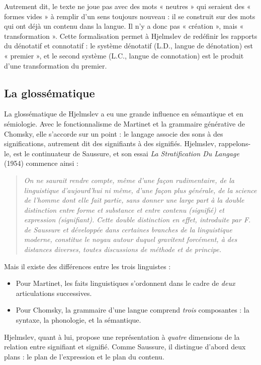Autrement dit, le texte ne joue pas avec des mots « neutres » qui seraient des « formes vides » à remplir d’un sens toujours nouveau : il se construit sur des mots qui ont déjà un contenu dans la langue. Il n’y a donc pas « création », mais « transformation ». Cette formalisation permet à Hjelmslev de redéfinir les rapports du dénotatif et connotatif : le système dénotatif (L.D., langue de dénotation) est « premier », et le second système (L.C., langue de connotation) est le produit d’une transformation du premier.

\subsection{La glossématique}
La glossématique de Hjelmslev a eu une grande influence en sémantique et en sémiologie. Avec le fonctionnalisme de Martinet et la grammaire générative de Chomsky, elle s’accorde sur un point : le langage associe des sons à des significations, autrement dit des signifiants à des signifiés. Hjelmslev, rappelons-le, est le continuateur de Saussure, et son essai \textit{La Stratification Du Langage} (1954) commence ainsi :
\begin{quote}\small\itshape
On ne saurait rendre compte, même d’une façon rudimentaire, de la linguistique d’aujourd’hui ni même, d’une façon plus générale, de la science de l’homme dont elle fait partie, sans donner une large part à la double distinction entre forme et substance et entre contenu (signifié) et expression (signifiant). Cette double distinction en effet, introduite par F. de Saussure et développée dans certaines branches de la linguistique moderne, constitue le noyau autour duquel gravitent forcément, à des distances diverses, toutes discussions de méthode et de principe.
\end{quote}
Mais il existe des différences entre les trois linguistes :
\begin{itemize}
\item Pour Martinet, les faits linguistiques s’ordonnent dans le cadre de \textit{deux} articulations successives.
\item Pour Chomsky, la grammaire d’une langue comprend \textit{trois} composantes : la syntaxe, la phonologie, et la sémantique.
\end{itemize}
Hjelmslev, quant à lui, propose une représentation à \textit{quatre} dimensions de la relation entre signifiant et signifié. Comme Saussure, il distingue d’abord deux plans : le plan de l’expression et le plan du contenu.

